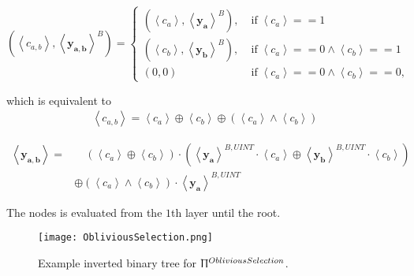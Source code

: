 \begin{equation}
    \left(\left\langle c_{a,b}\right\rangle , \left\langle \boldsymbol{y_{a,b}}\right\rangle ^{B}\right)=
    \begin{cases}
        \left(\left\langle c_{a}\right\rangle , \left\langle \boldsymbol{y_{a}}\right\rangle ^{B}\right) , & \operatorname{ if } \left\langle c_{a}\right\rangle ==1                                                  \\
        \left(\left\langle c_{b}\right\rangle , \left\langle \boldsymbol{y_{b}}\right\rangle ^{B}\right) , & \operatorname{ if } \left\langle c_{a}\right\rangle == 0 \land      \left\langle c_{b}\right\rangle ==1  \\
        \left(0,0\right)                                                                                   & \operatorname{ if } \left\langle c_{a}\right\rangle == 0 \land      \left\langle c_{b}\right\rangle ==0,
    \end{cases}
\end{equation}

which is equivalent to
\begin{equation}
    \begin{split}
        \left\langle c_{a,b}\right\rangle=\left\langle c_{a}\right\rangle\oplus \left\langle c_{b}\right\rangle \oplus \left(\left\langle c_{a}\right\rangle \land\left\langle c_{b}\right\rangle\right)
    \end{split}
\end{equation}

\begin{equation}
    \begin{split}
        \left\langle \boldsymbol{y_{a,b}}\right\rangle=& \quad \left(\left\langle c_{a}\right\rangle\oplus \left\langle c_{b}\right\rangle\right) \cdot \left(\left\langle \boldsymbol{y_{a}}\right\rangle ^{B,UINT}\cdot \left\langle c_{a}\right\rangle \oplus  \left\langle \boldsymbol{y_{b}}\right\rangle ^{B,UINT} \cdot \left\langle c_{b}\right\rangle \right)  \\
        & \oplus \left(\left\langle c_{a}\right\rangle \land\left\langle c_{b}\right\rangle\right) \cdot \left\langle \boldsymbol{y_{a}}\right\rangle ^{B,UINT}
    \end{split}
\end{equation}

The nodes is evaluated from the $1$th layer until the root.


\begin{figure}[htbp]
    \texttt{[image: ObliviousSelection.png]}
    \centering
    \caption{Example inverted binary tree for $\Uppi^{ObliviousSelection}$.}
    \label{img:ObliviousSelection}
\end{figure}
\FloatBarrier


